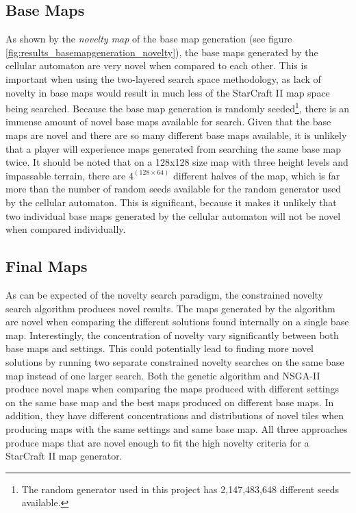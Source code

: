 \subsection{Base Maps}
\label{discussion_novelty_basemaps}
As shown by the \textit{novelty map} of the base map generation (see figure \ref{fig:results_basemapgeneration_novelty}), the base maps generated by the cellular automaton are very novel when compared to each other. This is important when using the two-layered search space methodology, as lack of novelty in base maps would result in much less of the StarCraft II map space being searched. Because the base map generation is randomly seeded\footnote{The random generator used in this project has 2,147,483,648 different seeds available.}, there is an immense amount of novel base maps available for search. Given that the base maps are novel and there are so many different base maps available, it is unlikely that a player will experience maps generated from searching the same base map twice. It should be noted that on a 128x128 size map with three height levels and impassable terrain, there are $4^{(128\times 64)}$ different halves of the map, which is far more than the number of random seeds available for the random generator used by the cellular automaton. This is significant, because it makes it unlikely that two individual base maps generated by the cellular automaton will not be novel when compared individually.

\subsection{Final Maps}
\label{discussion_novelty_finalmaps}
As can be expected of the novelty search paradigm, the constrained novelty search algorithm produces novel results. The maps generated by the algorithm are novel when comparing the different solutions found internally on a single base map. Interestingly, the concentration of novelty vary significantly between both base maps and settings. This could potentially lead to finding more novel solutions by running two separate constrained novelty searches on the same base map instead of one larger search. Both the genetic algorithm and NSGA-II produce novel maps when comparing the maps produced with different settings on the same base map and the best maps produced on different base maps. In addition, they have different concentrations and distributions of novel tiles when producing maps with the same settings and same base map. All three approaches produce maps that are novel enough to fit the high novelty criteria for a StarCraft II map generator.

